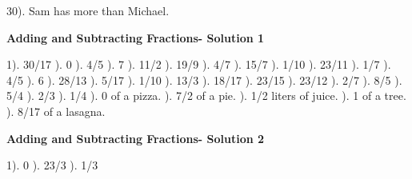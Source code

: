 \documentclass{article}%
\begin{document}
30). Sam has more than Michael.%
\newline%
\newpage%
\large%
\begin{center}%
\textbf{Adding and Subtracting Fractions- Solution 1}%
\newline%
\end{center} \normalsize%
1). 30/17%
). 0%
). 4/5%
). 7%
). 11/2%
). 19/9%
). 4/7%
). 15/7%
). 1/10%
). 23/11%
). 1/7%
). 4/5%
). 6%
). 28/13%
). 5/17%
). 1/10%
). 13/3%
). 18/17%
). 23/15%
). 23/12%
). 2/7%
). 8/5%
). 5/4%
). 2/3%
). 1/4%
). 0 of a pizza.%
). 7/2 of a pie.%
). 1/2 liters of juice.%
). 1 of a tree.%
). 8/17 of a lasagna.%
\newline%
\newpage%
\large%
\begin{center}%
\textbf{Adding and Subtracting Fractions- Solution 2}%
\newline%
\end{center} \normalsize%
1). 0%
). 23/3%
). 1/3%
\newline%
\end{document}
